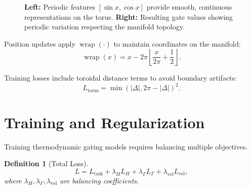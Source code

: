 \documentclass[12pt,letterpaper,twoside]{article}
\newtheorem{definition}{Definition}[section]
\begin{document}
\begin{figure}[htbp]
\centering
{}
\hfill
{}
\caption{\textbf{Left:} Periodic features $[\sin x, \cos x]$ provide smooth, continuous representations on the torus. \textbf{Right:} Resulting gate values showing periodic variation respecting the manifold topology.}
\label{fig:periodic-features}
\end{figure}

Position updates apply $\operatorname{wrap}(\cdot)$ to maintain coordinates on the manifold:
\[
\operatorname{wrap}(x) = x - 2\pi \left\lfloor \frac{x}{2\pi} + \frac{1}{2} \right\rfloor.
\]

Training losses include toroidal distance terms to avoid boundary artifacts:
\[
L_{\text{torus}} = \min\left(|\Delta|, 2\pi - |\Delta|\right)^2.
\]

\section{Training and Regularization}

Training thermodynamic gating models requires balancing multiple objectives.

\begin{definition}[Total Loss]
\[
L = L_{\text{task}} + \lambda_H L_H + \lambda_\Gamma L_\Gamma + \lambda_{\text{vel}} L_{\text{vel}},
\]
where $\lambda_H, \lambda_\Gamma, \lambda_{\text{vel}}$ are balancing coefficients.
\end{definition}
\end{document}
